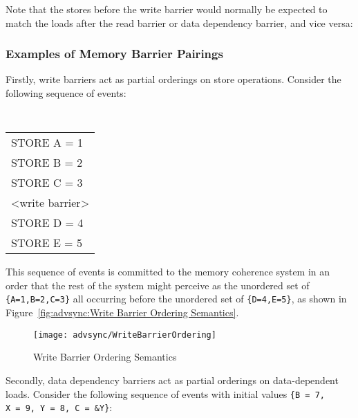 Note that the stores before the write barrier would normally be expected to
match the loads after the read barrier or data dependency barrier, and vice
versa:

\begin{center}
\end{center}

\subsubsection{Examples of Memory Barrier Pairings}
\label{sec:advsync:Examples of Memory Barrier Pairings}

Firstly, write barriers act as partial orderings on store operations.
Consider the following sequence of events:

\vspace{5pt}
\begin{minipage}[t]{\columnwidth}
\tt
\scriptsize
\begin{tabular}{l}
	STORE A = 1 \\
	STORE B = 2 \\
	STORE C = 3 \\
	<write barrier> \\
	STORE D = 4 \\
	STORE E = 5 \\
\end{tabular}
\end{minipage}
\vspace{5pt}

This sequence of events is committed to the memory coherence system in an order
that the rest of the system might perceive as the unordered set of
{\tt \{A=1,B=2,C=3\}}
all occurring before the unordered set of
{\tt \{D=4,E=5\}}, as shown in
Figure~\ref{fig:advsync:Write Barrier Ordering Semantics}.

\begin{figure*}[htb]
\centering
\texttt{[image: advsync/WriteBarrierOrdering]}
\caption{Write Barrier Ordering Semantics}
\end{figure*}

Secondly, data dependency barriers act as partial orderings on data-dependent
loads.  Consider the following sequence of events with initial values
{\tt \{B~=~7, X~=~9, Y~=~8, C~=~\&Y\}}:


